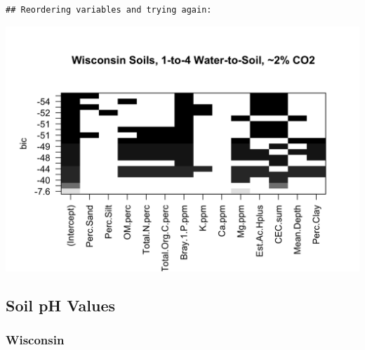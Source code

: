 \documentclass[]{article}
\newenvironment{Shaded}{\begin{snugshade}}{\end{snugshade}}
\newcommand{\DataTypeTok}[1]{\textcolor[rgb]{0.13,0.29,0.53}{#1}}
\newcommand{\KeywordTok}[1]{\textcolor[rgb]{0.13,0.29,0.53}{\textbf{#1}}}
\newcommand{\NormalTok}[1]{#1}
\newcommand{\StringTok}[1]{\textcolor[rgb]{0.31,0.60,0.02}{#1}}
\begin{document}
\begin{verbatim}
## Reordering variables and trying again:
\end{verbatim}

\begin{Shaded}
\end{Shaded}

\includegraphics{output-rmd/bic.wisc.one2four.highco2-1.png}

\hypertarget{soil-ph-values}{%
\subsection{Soil pH Values}\label{soil-ph-values}}

\hypertarget{wisconsin}{%
\subsubsection{Wisconsin}\label{wisconsin}}
\end{document}
